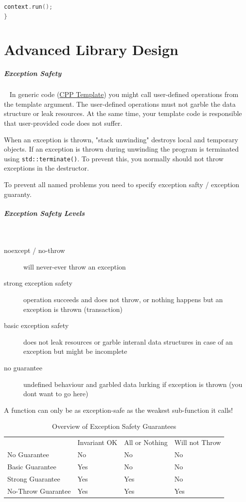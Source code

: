 \documentclass[11pt,twoside,landscape]{article}
\begin{document}
\begin{multicols}{2}
\begin{lstlisting}[language=c++,label=lst:org8f97317,caption={Example for signal handling using ASIO},captionpos=b,numbers=none]
  context.run();
}
\end{lstlisting}

\section{Advanced Library Design}
\label{sec:org3c559b0}
\subparagraph{Exception Safety} \
\label{sec:org2ae1514}
In generic code (\href{../../../roam/20230629084234-cpp_template.org}{CPP Template}) you might call user-defined operations from the template argument.
The user-defined operations must not garble the data structure or leak resources.
At the same time, your template code is responsible that user-provided code does not suffer.

When an exception is thrown, "stack unwinding" destroys local and temporary objects.
If an exception is thrown during unwinding the program is terminated using \texttt{std::terminate()}.
To prevent this, you normally should not throw exceptions in the destructor.

To prevent all named problems you need to specify exception safty / exception guaranty.

\subparagraph{Exception Safety Levels} \
\label{sec:orgb7906a8}
\begin{description}
\item[{noexcept / no-throw}] will never-ever throw an exception
\item[{strong exception safety}] operation succeeds and does not throw, or nothing happens but an exception is thrown (transaction)
\item[{basic exception safety}] does not leak resources or garble interanl data structures in case of an exception but might be incomplete
\item[{no guarantee}] undefined behaviour and garbled data lurking if exception is thrown (you dont want to go here)
\end{description}


A function can only be as exception-safe as the weakest sub-function it calls!


\begin{table}[htbp]
\caption{\label{tab:org2b98058}Overview of Exception Safety Guarantees}
\centering
\begin{tabular}{llll}
 & Invariant OK & All or Nothing & Will not Throw\\[0pt]
No Guarantee & No & No & No\\[0pt]
Basic Guarantee & Yes & No & No\\[0pt]
Strong Guarantee & Yes & Yes & No\\[0pt]
No-Throw Guarantee & Yes & Yes & Yes\\[0pt]
\end{tabular}
\end{table}


\end{multicols}
\end{document}
